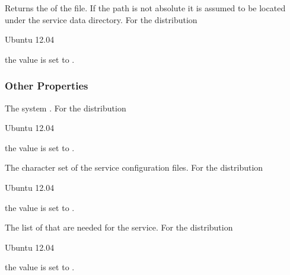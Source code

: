
Returns the  of the  file. If the path is not
absolute it is assumed to be located under the service
data directory.
For the distribution
\begin{inparaitem}
\item[\TheDistribution{ubuntu}] Ubuntu 12.04
\end{inparaitem}
the value is set to .

\subsubsection{Other Properties}


The system . 
For the distribution
\begin{inparaitem}
\item[\TheDistribution{ubuntu}] Ubuntu 12.04
\end{inparaitem}
the value is set to .


The character set  of the service configuration files. 
For the distribution
\begin{inparaitem}
\item[\TheDistribution{ubuntu}] Ubuntu 12.04
\end{inparaitem}
the value is set to .


The list of  that are needed for the service.
For the distribution
\begin{inparaitem}
\item[\TheDistribution{ubuntu}] Ubuntu 12.04
\end{inparaitem}
the value is set to .

